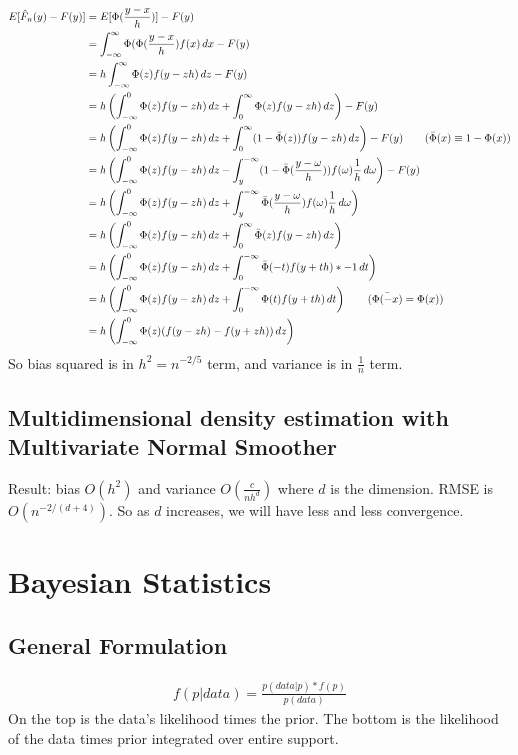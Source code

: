     \begin{align*}
        E[\hat{F}_n(y) - F(y)]
        & = E[\Phi(\frac{y-x}{h})] - F(y) \\
        & = \int_{-\infty}^\infty \Phi(\Phi(\frac{y-x}{h}) f(x) \, dx - F(y) \\
        & = h\int_{-\infty}^\infty \Phi(z) f(y-zh) \, dz - F(y) \\
        & = h\left(\int_{-\infty}^0 \Phi(z)f(y-zh) \, dz + \int_{0}^\infty \Phi(z)f(y-zh) \, dz \right) - F(y) \\
        & = h\left(\int_{-\infty}^0 \Phi(z)f(y-zh) \, dz + \int_{0}^\infty (1 - \bar{\Phi}(z))f(y-zh) \, dz \right) - F(y) \tag{$\bar{\Phi}(x) \equiv 1 - \Phi(x)$} \\
        & = h\left(\int_{-\infty}^0 \Phi(z)f(y-zh) \, dz - \int_{y}^{-\infty} (1 - \bar{\Phi}(\frac{y-\omega}{h}))f(\omega) \frac{1}{h} \, d\omega \right) - F(y) \\
        & =  h\left(\int_{-\infty}^0 \Phi(z)f(y-zh) \, dz + \int_{y}^{-\infty}  \bar{\Phi}(\frac{y-\omega}{h})f(\omega) \frac{1}{h} \, d\omega \right)  \\
        & =  h\left(\int_{-\infty}^0 \Phi(z)f(y-zh) \, dz + \int_{0}^{\infty}  \bar{\Phi}(z)f(y-zh) \, dz \right)  \\
        & =  h\left(\int_{-\infty}^0 \Phi(z)f(y-zh) \, dz + \int_{0}^{-\infty}  \bar{\Phi}(-t)f(y+th) * -1 \, dt \right)  \\
        & =  h\left(\int_{-\infty}^0 \Phi(z)f(y-zh) \, dz + \int_{0}^{-\infty}  \Phi(t)f(y+th) \, dt \right) \tag{$\bar{\Phi(-x)}=\Phi(x)$} \\
        & =  h\left(\int_{-\infty}^0 \Phi(z)(f(y-zh) - f(y + zh)) \, dz \right)
    \end{align*}
So bias squared is in $h^2 = n^{-2/5}$ term, and variance is in $\frac{1}{n}$ term.

\subsection{Multidimensional density estimation with Multivariate Normal Smoother} 
Result: bias $O(h^2)$ and variance $O(\frac{c}{nh^d})$ where $d$ is the dimension. RMSE is $O(n^{-2/(d+4)})$. So as $d$ increases, we will have less and less convergence. 


\section{Bayesian Statistics} 
\subsection{General Formulation} 
    \begin{align*}
        f(p|data) = \frac{p(data|p) * f(p) }{p(data)}
    \end{align*}
On the top is the data's likelihood times the prior. The bottom is the likelihood of the data times prior integrated over entire support. 

